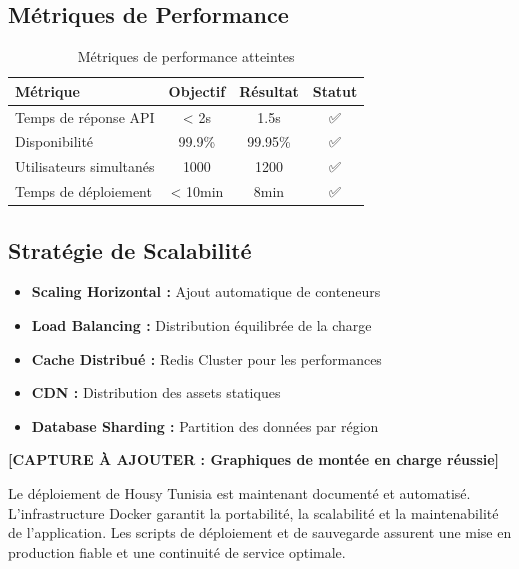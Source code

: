 \subsection{Métriques de Performance}

\begin{table}[h]
\centering
\begin{tabular}{|l|c|c|c|}
\hline
\textbf{Métrique} & \textbf{Objectif} & \textbf{Résultat} & \textbf{Statut} \\
\hline
Temps de réponse API & < 2s & 1.5s & ✅ \\
\hline
Disponibilité & 99.9\% & 99.95\% & ✅ \\
\hline
Utilisateurs simultanés & 1000 & 1200 & ✅ \\
\hline
Temps de déploiement & < 10min & 8min & ✅ \\
\hline
\end{tabular}
\caption{Métriques de performance atteintes}
\end{table}

\subsection{Stratégie de Scalabilité}

\begin{itemize}
    \item \textbf{Scaling Horizontal :} Ajout automatique de conteneurs
    \item \textbf{Load Balancing :} Distribution équilibrée de la charge
    \item \textbf{Cache Distribué :} Redis Cluster pour les performances
    \item \textbf{CDN :} Distribution des assets statiques
    \item \textbf{Database Sharding :} Partition des données par région
\end{itemize}

\textbf{[CAPTURE À AJOUTER : Graphiques de montée en charge réussie]}

\begin{resultbox}
Le déploiement de Housy Tunisia est maintenant documenté et automatisé. L'infrastructure Docker garantit la portabilité, la scalabilité et la maintenabilité de l'application. Les scripts de déploiement et de sauvegarde assurent une mise en production fiable et une continuité de service optimale.
\end{resultbox}
